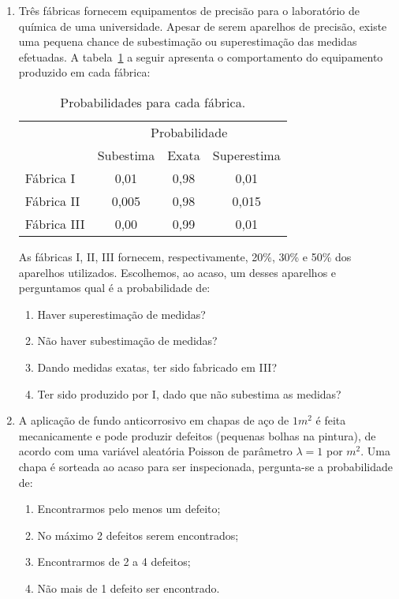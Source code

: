 \documentclass[12pt, a4paper]{article}
\begin{document}
\begin{enumerate}

\item Três fábricas fornecem equipamentos de precisão para o laboratório de química de uma universidade. Apesar de serem aparelhos de precisão, existe uma pequena chance de subestimação ou superestimação das medidas efetuadas. A tabela~\ref{tab:fab} a seguir apresenta o comportamento do equipamento produzido em cada fábrica:
\begin{table}[htbp]
	\centering
	\caption{Probabilidades para cada fábrica.}
	\label{tab:fab}
	\begin{tabular}{l|ccc}
		\toprule[0.05cm]
		& \multicolumn{3}{|c}{Probabilidade}\\ \cmidrule[0.025cm]{2-4}
		& Subestima & Exata & Superestima \\ \midrule[0.05cm]
		Fábrica I & 0,01 & 0,98 & 0,01 \\
		Fábrica II & 0,005 & 0,98 & 0,015 \\
		Fábrica III & 0,00 & 0,99 & 0,01 \\ \bottomrule[0.05cm]
	\end{tabular}
\end{table}
As fábricas I, II, III fornecem, respectivamente, 20\%, 30\% e 50\% dos aparelhos utilizados. Escolhemos, ao acaso, um desses aparelhos e perguntamos qual é a probabilidade de:
\begin{enumerate}
	\item Haver superestimação de medidas?
	\item Não haver subestimação de medidas?
	\item Dando medidas exatas, ter sido fabricado em III?
	\item Ter sido produzido por I, dado que não subestima as medidas?
\end{enumerate}

\item A aplicação de fundo anticorrosivo em chapas de aço de $1m^2$ é feita mecanicamente e pode produzir defeitos (pequenas bolhas na pintura), de acordo com uma variável aleatória Poisson de parâmetro $\lambda=1$ por $m^2$. Uma chapa é sorteada ao acaso para ser inspecionada, pergunta-se a probabilidade de:
\begin{enumerate}
	\item Encontrarmos pelo menos um defeito;
	\item No máximo 2 defeitos serem encontrados;
	\item Encontrarmos de 2 a 4 defeitos;
	\item Não mais de 1 defeito ser encontrado.
\end{enumerate}


\end{enumerate}
\end{document}
